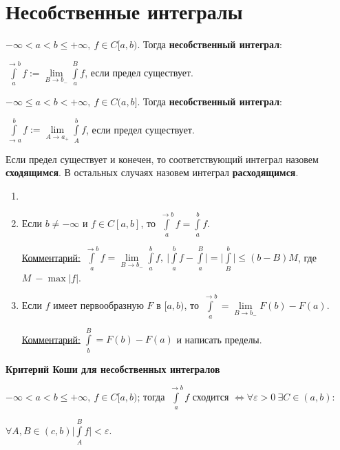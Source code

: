 \section{Несобственные интегралы}

\begin{definition}
    $-\infty < a < b\leq +\infty,\ f\in C[a,b).$ Тогда \textbf{несобственный интеграл}: 
    
    $\int\limits_a^{\rightarrow b}f:=\lim \limits_{B\rightarrow b_-}\int\limits_a^Bf$, если предел существует.
\end{definition}

\begin{definition}
    $-\infty \leq a < b< +\infty,\ f\in C(a,b].$ Тогда \textbf{несобственный интеграл}: 
    
    $\int\limits_{\rightarrow a}^b f:=\lim \limits_{A\rightarrow a_+}\int\limits_A^b f$, если предел существует.
\end{definition}

\begin{definition}
    Если предел существует и конечен, то соответствующий интеграл назовем \textbf{сходящимся}. В остальных случаях назовем интеграл \textbf{расходящимся}.
\end{definition}

\begin{remark}
    \begin{enumerate}
        \item[]
        \item Если $b\neq -\infty$ и $f\in C[a,b]$, то $\int\limits_a^{\rightarrow b} f = \int\limits_a^{b} f$.

        \underline{Комментарий:} $\int\limits_a^{\rightarrow b} f=\lim\limits_{B\rightarrow b_-}\int\limits_a^{b}f,\ \bigg|\int\limits_a^b f-\int\limits_a^B\bigg|=\bigg|\int\limits_B^b\bigg|\leq (b-B)M$, где $M\ -\max |f|$.

        \item Если $f$ имеет первообразную $F$ в $[a,b)$, то $\int\limits_a^{\rightarrow b}=\lim\limits_{B\rightarrow b_-} F(b)-F(a)$.

        \underline{Комментарий:} $\int\limits_b^B=F(b)-F(a)$ и написать пределы.
    \end{enumerate}
\end{remark}

\begin{theorem}
    \textbf{Критерий Коши для несобственных интегралов}

    $-\infty <a<b\leq +\infty,\ f\in C[a,b)$; тогда $\int\limits_a^{\rightarrow b}f$ сходится $\Leftrightarrow\forall \varepsilon>0\ \exists C\in (a,b): $
    
    $\forall A,B\in (c,b) \bigg|\int\limits_A^B f\bigg |<\varepsilon$.
\end{theorem}

